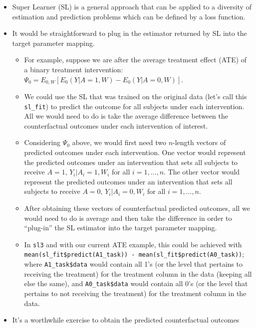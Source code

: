 \documentclass[12pt, krantz2,]{krantz}
\providecommand{\tightlist}{%
  \setlength{\itemsep}{0pt}\setlength{\parskip}{0pt}}
\theoremstyle{definition}
\theoremstyle{definition}
\theoremstyle{definition}
\newcommand{\1}{\mathbbm{1}}
\begin{document}
\begin{itemize}
\item
  Super Learner (SL) is a general approach that can be applied to a diversity of
  estimation and prediction problems which can be defined by a loss function.
\item
  It would be straightforward to plug in the estimator returned by SL into the
  target parameter mapping.

  \begin{itemize}
  \tightlist
  \item
    For example, suppose we are after the average treatment effect (ATE) of a
    binary treatment intervention:
    \(\Psi_0 = E_{0,W}[E_0(Y|A=1,W) - E_0(Y|A=0,W)]\).
  \item
    We could use the SL that was trained on the original data (let's call
    this \texttt{sl\_fit}) to predict the outcome for all subjects under each
    intervention. All we would need to do is take the average difference
    between the counterfactual outcomes under each intervention of interest.
  \item
    Considering \(\Psi_0\) above, we would first need two \(n\)-length vectors of
    predicted outcomes under each intervention. One vector would represent
    the predicted outcomes under an intervention that sets all subjects to
    receive \(A=1\), \(Y_i|A_i=1,W_i\) for all \(i=1,\ldots,n\). The other vector
    would represent the predicted outcomes under an intervention that sets
    all subjects to receive \(A=0\), \(Y_i|A_i=0,W_i\) for all \(i=1,\ldots,n\).
  \item
    After obtaining these vectors of counterfactual predicted outcomes, all
    we would need to do is average and then take the difference in order to
    ``plug-in'' the SL estimator into the target parameter mapping.
  \item
    In \texttt{sl3} and with our current ATE example, this could be achieved with
    \texttt{mean(sl\_fit\$predict(A1\_task))\ -\ mean(sl\_fit\$predict(A0\_task))};
    where \texttt{A1\_task\$data} would contain all 1's (or the level that pertains to
    receiving the treatment) for the treatment column in the data (keeping
    all else the same), and \texttt{A0\_task\$data} would contain all 0's (or the
    level that pertains to not receiving the treatment) for the treatment
    column in the data.
  \end{itemize}
\item
  It's a worthwhile exercise to obtain the predicted counterfactual outcomes

\end{itemize}
\end{document}
